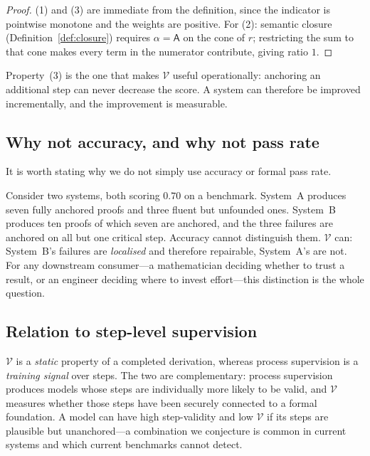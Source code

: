 \documentclass[11pt,a4paper]{article}
\theoremstyle{definition}
\theoremstyle{plain}
\theoremstyle{remark}
\newcommand{\V}{\mathcal{V}}           %
\begin{document}
\begin{proof}
(1) and (3) are immediate from the definition, since the indicator is
pointwise monotone and the weights are positive. For (2): semantic closure
(Definition~\ref{def:closure}) requires $\alpha = \mathsf{A}$ on the cone of
$r$; restricting the sum to that cone makes every term in the numerator
contribute, giving ratio $1$.
\end{proof}

Property~(3) is the one that makes $\V$ useful operationally: anchoring an
additional step can never decrease the score. A system can therefore be improved
incrementally, and the improvement is measurable.

\subsection{Why not accuracy, and why not pass rate}

It is worth stating why we do not simply use accuracy or formal pass rate.

Consider two systems, both scoring $0.70$ on a benchmark. System~A produces
seven fully anchored proofs and three fluent but unfounded ones. System~B
produces ten proofs of which seven are anchored, and the three failures are
anchored on all but one critical step. Accuracy cannot distinguish them.
$\V$ can: System~B's failures are \emph{localised} and therefore repairable,
System~A's are not. For any downstream consumer---a mathematician deciding
whether to trust a result, or an engineer deciding where to invest effort---this
distinction is the whole question.

\subsection{Relation to step-level supervision}

$\V$ is a \emph{static} property of a completed derivation, whereas process
supervision \cite{lightman2023verify} is a \emph{training signal} over steps.
The two are complementary: process supervision produces models whose steps are
individually more likely to be valid, and $\V$ measures whether those steps have
been securely connected to a formal foundation. A model can have high
step-validity and low $\V$ if its steps are plausible but unanchored---a
combination we conjecture is common in current systems and which current
benchmarks cannot detect.

\end{document}
